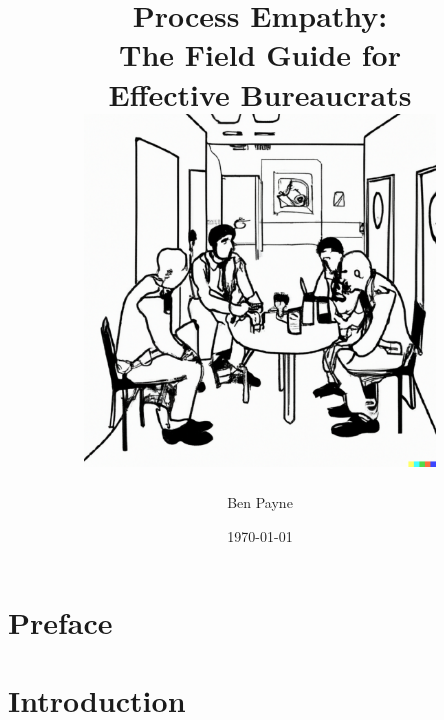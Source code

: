 \documentclass[openright]{book}
\title{\huge{Process Empathy:\\
The Field Guide for\\ Effective Bureaucrats}\\
\vfill
\includegraphics[width=0.7\textwidth]{images/bureaucrat_empathizing_with_coworkers_in_office_breakroom.pdf}
}
\author{\huge Ben Payne}
\date{\today}
\begin{document}





\begin{titlepage}
\iftoggle{boundbook}{}{\maketitle}
\thispagestyle{empty}
\end{titlepage}
\clearpage





\frontmatter %

\clearpage

\iftoggle{showminitoc}{\dominitoc}{} %
\hypertarget{contents}{}
\tableofcontents\label{sec:toc}

\chapter{Preface}

\mainmatter %


\chapter{Introduction\label{sec:introduction}}
\iftoggle{showbacktotoc}{{\footnotesize Back to the \hyperref[sec:toc]{Main Table of Contents}}}{}
\end{document}
